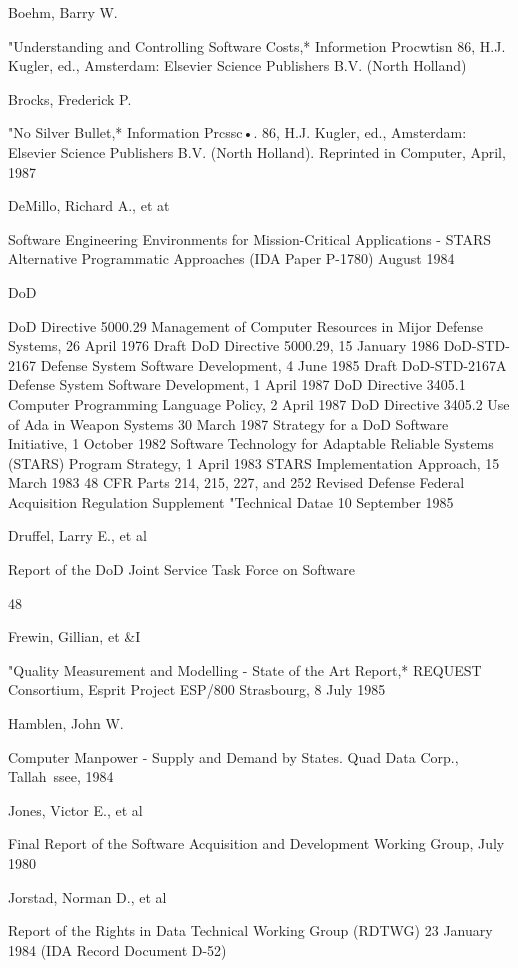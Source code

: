 \documentclass[12pt]{article}
\begin{document}
Boehm, Barry W.

"Understanding and Controlling Software Costs,*
Informetion Procwtisn 86, H.J. Kugler, ed., Amsterdam:
Elsevier Science Publishers B.V. (North Holland)

Brocks, Frederick P.

"No Silver Bullet,* Information Prcssc•. 86,
H.J. Kugler, ed., Amsterdam: Elsevier Science Publishers B.V.
(North Holland). Reprinted in Computer, April, 1987

DeMillo, Richard A., et at

Software Engineering Environments for Mission-Critical
Applications - STARS Alternative Programmatic
Approaches
(IDA Paper P-1780) August 1984

DoD

DoD Directive 5000.29 Management of Computer Resources in
Mijor Defense Systems, 26 April 1976
Draft DoD Directive 5000.29, 15 January 1986
DoD-STD-2167 Defense System Software Development, 4 June 1985
Draft DoD-STD-2167A Defense System Software Development,
1 April 1987
DoD Directive 3405.1 Computer Programming Language Policy,
2 April 1987
DoD Directive 3405.2 Use of Ada in Weapon Systems 30 March 1987
Strategy for a DoD Software Initiative, 1 October 1982
Software Technology for Adaptable Reliable Systems (STARS)
Program Strategy, 1 April 1983
STARS Implementation Approach, 15 March 1983
48 CFR Parts 214, 215, 227, and 252 Revised Defense Federal
Acquisition Regulation Supplement "Technical Datae
10 September 1985

Druffel, Larry E., et al

Report of the DoD Joint Service Task Force on Software

48

Frewin, Gillian, et \&I

"Quality Measurement and Modelling - State of the Art
Report,* REQUEST Consortium, Esprit Project ESP/800 Strasbourg,
8 July 1985

Hamblen, John W.

Computer Manpower - Supply and Demand by States.
Quad Data Corp., Tallah~ssee, 1984

Jones, Victor E., et al

Final Report of the Software Acquisition and Development
Working Group, July 1980

Jorstad, Norman D., et al

Report of the Rights in Data Technical Working Group
(RDTWG) 23 January 1984 (IDA Record Document D-52)
\end{document}
